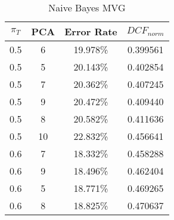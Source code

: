 \begin{center}
\begin{longtable}{|c|c|c|c|}
\caption{Naive Bayes MVG}\label{tab:mvg_naiveacctable}\\
\hline
$\pi_T$ & PCA & Error Rate & $DCF_{norm}$\\
\hline
0.5 & 6 & 19.978\% & 0.399561\\
\hline
0.5 & 5 & 20.143\% & 0.402854\\
\hline
0.5 & 7 & 20.362\% & 0.407245\\
\hline
0.5 & 9 & 20.472\% & 0.409440\\
\hline
0.5 & 8 & 20.582\% & 0.411636\\
\hline
0.5 & 10 & 22.832\% & 0.456641\\
\hline
0.6 & 7 & 18.332\% & 0.458288\\
\hline
0.6 & 9 & 18.496\% & 0.462404\\
\hline
0.6 & 5 & 18.771\% & 0.469265\\
\hline
0.6 & 8 & 18.825\% & 0.470637\\
\hline
\hline
\end{longtable}
\end{center}
